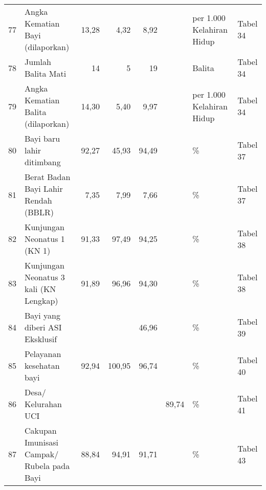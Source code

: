 \begin{small}
\begin{longtable}{rY{12em}rrrrY{5em}Y{5em}}
	 77 & Angka Kematian Bayi (dilaporkan)                                                      &  13,28 &   4,32 &    8,92 &                   & per 1.000 Kelahiran Hidup      & Tabel 34 \\
	                   78 & Jumlah Balita Mati                                                                    &     14 &      5 &      19 &                   & Balita                         & Tabel 34 \\
	 79 & Angka Kematian Balita (dilaporkan)                                                    &  14,30 &   5,40 &    9,97 &                   & per 1.000 Kelahiran Hidup      & Tabel 34 \\
	                   80 & Bayi baru lahir ditimbang                                                             &  92,27 &  45,93 &   94,49 &                   & \%                             & Tabel 37 \\
	 81 & Berat Badan Bayi Lahir Rendah (BBLR)                                                  &   7,35 &   7,99 &    7,66 &                   & \%                             & Tabel 37 \\
	                   82 & Kunjungan Neonatus 1 (KN 1)                                                           &  91,33 &  97,49 &   94,25 &                   & \%                             & Tabel 38 \\
	 83 & Kunjungan Neonatus 3 kali (KN Lengkap)                                                &  91,89 &  96,96 &   94,30 &                   & \%                             & Tabel 38 \\
	                   84 & Bayi yang diberi ASI Eksklusif                                                        &        &        &   46,96 &                   & \%                             & Tabel 39 \\
	 85 & Pelayanan kesehatan bayi                                                              &  92,94 & 100,95 &   96,74 &                   & \%                             & Tabel 40 \\
	                   86 & Desa/ Kelurahan UCI                                                                   &        &        &         &             89,74 & \%                             & Tabel 41 \\
	 87 & Cakupan Imunisasi Campak/ Rubela pada Bayi                                            &  88,84 &  94,91 &   91,71 &                   & \%                             & Tabel 43 \\

\end{longtable}
\end{small}
